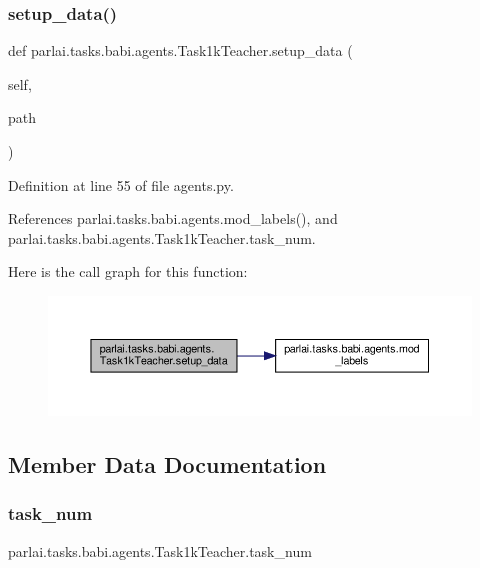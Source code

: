 \subsubsection{\texorpdfstring{setup\+\_\+data()}{setup\_data()}}
{\footnotesize\ttfamily def parlai.\+tasks.\+babi.\+agents.\+Task1k\+Teacher.\+setup\+\_\+data (\begin{DoxyParamCaption}\item[{}]{self,  }\item[{}]{path }\end{DoxyParamCaption})}



Definition at line 55 of file agents.\+py.



References parlai.\+tasks.\+babi.\+agents.\+mod\+\_\+labels(), and parlai.\+tasks.\+babi.\+agents.\+Task1k\+Teacher.\+task\+\_\+num.

Here is the call graph for this function\+:
\nopagebreak
\begin{figure}[H]
\begin{center}
\leavevmode
\includegraphics[width=350pt]{classparlai_1_1tasks_1_1babi_1_1agents_1_1Task1kTeacher_a191f80b829fd3103238317eed2cad03e_cgraph}
\end{center}
\end{figure}


\subsection{Member Data Documentation}
\mbox{\label{classparlai_1_1tasks_1_1babi_1_1agents_1_1Task1kTeacher_a0c153d5823837de445669016a18540e7}} 
\subsubsection{\texorpdfstring{task\+\_\+num}{task\_num}}
{\footnotesize\ttfamily parlai.\+tasks.\+babi.\+agents.\+Task1k\+Teacher.\+task\+\_\+num}



